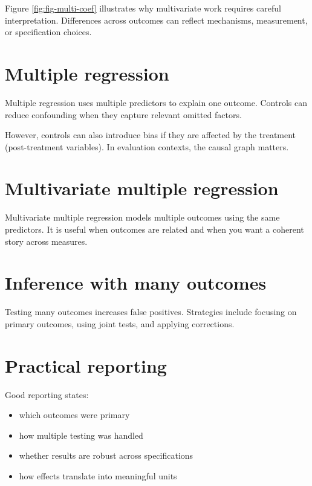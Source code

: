 \documentclass[
  11pt,
  oneside]{book}
\providecommand{\tightlist}{%
  \setlength{\itemsep}{0pt}\setlength{\parskip}{0pt}}
\begin{document}
Figure \ref{fig:fig-multi-coef} illustrates why multivariate work requires careful interpretation. Differences across outcomes can reflect mechanisms, measurement, or specification choices.

\section{Multiple regression}\label{multiple-regression}

Multiple regression uses multiple predictors to explain one outcome. Controls can reduce confounding when they capture relevant omitted factors.

However, controls can also introduce bias if they are affected by the treatment (post-treatment variables). In evaluation contexts, the causal graph matters.

\section{Multivariate multiple regression}\label{multivariate-multiple-regression}

Multivariate multiple regression models multiple outcomes using the same predictors. It is useful when outcomes are related and when you want a coherent story across measures.

\section{Inference with many outcomes}\label{inference-with-many-outcomes}

Testing many outcomes increases false positives. Strategies include focusing on primary outcomes, using joint tests, and applying corrections.

\section{Practical reporting}\label{practical-reporting}

Good reporting states:

\begin{itemize}
\tightlist
\item
  which outcomes were primary
\item
  how multiple testing was handled
\item
  whether results are robust across specifications
\item
  how effects translate into meaningful units
\end{itemize}
\end{document}
